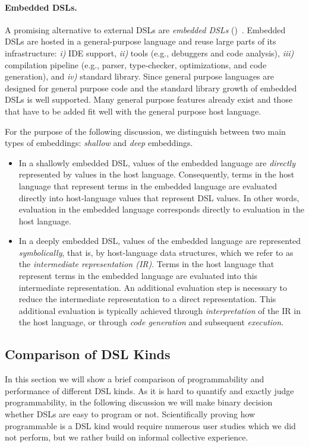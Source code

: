 \paragraph{Embedded DSLs.} A promising alternative to external DSLs are \emph{embedded DSLs} (\edsls)~\cite{Hudak96csur}. Embedded DSLs
are hosted in a general-purpose language and reuse large parts of its
infrastructure: \emph{i)} IDE support, \emph{ii)} tools (e.g., debuggers and code analysis), \emph{iii)} compilation pipeline (e.g., parser, type-checker, optimizations, and code generation), and \emph{iv)} standard library. Since general purpose languages are designed for general
 purpose code and the standard library growth of embedded DSLs is well supported. Many
 general purpose features already exist and those that have to be added fit well with the
 general purpose host language.

For the purpose of the following discussion, we distinguish between two main types of embeddings: \emph{shallow} and \emph{deep} embeddings.

  \begin{itemize}

  \item In a shallowly embedded DSL, values of the embedded language
    are \emph{directly} represented by values in the host language.
    Consequently, terms in the host language that represent terms in
    the embedded language are evaluated directly into host-language
    values that represent DSL values. In other words, evaluation in
    the embedded language corresponds directly to evaluation in the
    host language.


  \item In a deeply embedded DSL, values of the embedded language are
    represented \emph{symbolically}, that is, by host-language data
    structures, which we refer to as the \emph{intermediate
      representation (IR)}. Terms in the host language that represent
    terms in the embedded language are evaluated into this intermediate
    representation. An additional evaluation step is necessary to
    reduce the intermediate representation to a direct representation.
    This additional evaluation is typically achieved through
    \emph{interpretation} of the IR in the host language, or through
    \emph{code generation} and subsequent \emph{execution}.

  \end{itemize}


\subsection{Comparison of DSL Kinds}
\label{sec:comparison-of-dsl-kinds}
In this section we will show a brief comparison of programmability and performance
 of different DSL kinds. As it is hard to quantify and exactly judge programmability,
 in the following discussion we will make binary decision whether DSLs are easy to
 program or not. Scientifically proving how programmable is a DSL kind would require
 numerous user studies which we did not perform, but we rather build on informal
 collective experience.

